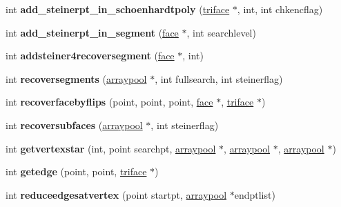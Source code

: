 \begin{DoxyCompactItemize}
int {\bfseries add\+\_\+steinerpt\+\_\+in\+\_\+schoenhardtpoly} (\hyperlink{classtetgenmesh_1_1triface}{triface} $\ast$, int, int chkencflag)
\item 
\mbox{\label{classtetgenmesh_a3de6e9d82e74671af7f038043b5e9bcc}} 
int {\bfseries add\+\_\+steinerpt\+\_\+in\+\_\+segment} (\hyperlink{classtetgenmesh_1_1face}{face} $\ast$, int searchlevel)
\item 
\mbox{\label{classtetgenmesh_a9d878a0e64588b0471a58e534affea8e}} 
int {\bfseries addsteiner4recoversegment} (\hyperlink{classtetgenmesh_1_1face}{face} $\ast$, int)
\item 
\mbox{\label{classtetgenmesh_a50e12e269b11573e6e1b91347ad19b37}} 
int {\bfseries recoversegments} (\hyperlink{classtetgenmesh_1_1arraypool}{arraypool} $\ast$, int fullsearch, int steinerflag)
\item 
\mbox{\label{classtetgenmesh_a38c7fc92a1ced3f4885006837a83c2e6}} 
int {\bfseries recoverfacebyflips} (point, point, point, \hyperlink{classtetgenmesh_1_1face}{face} $\ast$, \hyperlink{classtetgenmesh_1_1triface}{triface} $\ast$)
\item 
\mbox{\label{classtetgenmesh_ace09080e4f274e0a48cd1728475878c9}} 
int {\bfseries recoversubfaces} (\hyperlink{classtetgenmesh_1_1arraypool}{arraypool} $\ast$, int steinerflag)
\item 
\mbox{\label{classtetgenmesh_a9ba3540239e05588c5a2021b15d89a8e}} 
int {\bfseries getvertexstar} (int, point searchpt, \hyperlink{classtetgenmesh_1_1arraypool}{arraypool} $\ast$, \hyperlink{classtetgenmesh_1_1arraypool}{arraypool} $\ast$, \hyperlink{classtetgenmesh_1_1arraypool}{arraypool} $\ast$)
\item 
\mbox{\label{classtetgenmesh_ae680a6f607f14655b0078e066a95bc34}} 
int {\bfseries getedge} (point, point, \hyperlink{classtetgenmesh_1_1triface}{triface} $\ast$)
\item 
\mbox{\label{classtetgenmesh_af61e64f6536238f25296f3f26b360935}} 
int {\bfseries reduceedgesatvertex} (point startpt, \hyperlink{classtetgenmesh_1_1arraypool}{arraypool} $\ast$endptlist)

\end{DoxyCompactItemize}

